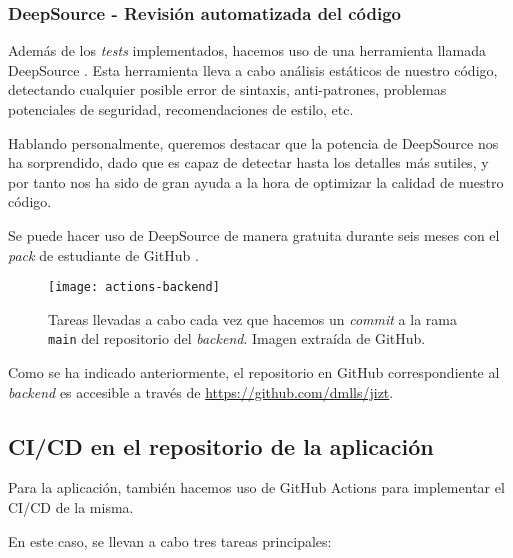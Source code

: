 \newpage

\subsubsection{DeepSource - Revisión automatizada del código}

Además de los \emph{tests} implementados, hacemos uso de una herramienta llamada DeepSource \cite{deepsource}. Esta herramienta lleva a cabo análisis estáticos de nuestro código, detectando cualquier posible error de sintaxis, anti-patrones, problemas potenciales de seguridad, recomendaciones de estilo, etc.

Hablando personalmente, queremos destacar que la potencia de DeepSource nos ha sorprendido, dado que es capaz de detectar hasta los detalles más sutiles, y por tanto nos ha sido de gran ayuda a la hora de optimizar la calidad de nuestro código.

Se puede hacer uso de DeepSource de manera gratuita durante seis meses con el \emph{pack} de estudiante de GitHub \cite{gh-student-pack}.

\smallskip

\begin{figure}[h!]
	\centering
	\texttt{[image: actions-backend]}
	\caption[GitHub Actions en el \emph{backend}.]{Tareas llevadas a cabo cada vez que hacemos un \emph{commit} a la rama \texttt{main} del repositorio del \emph{backend}. Imagen extraída de GitHub.}
\end{figure}

Como se ha indicado anteriormente, el repositorio en GitHub correspondiente al \emph{backend} es accesible a través de \href{https://github.com/dmlls/jizt}{https://github.com/dmlls/jizt}.

\subsection{CI/CD en el repositorio de la aplicación} \label{subsec:ci-cd-app}

Para la aplicación, también hacemos uso de GitHub Actions para implementar el CI/CD de la misma.

En este caso, se llevan a cabo tres tareas principales:

